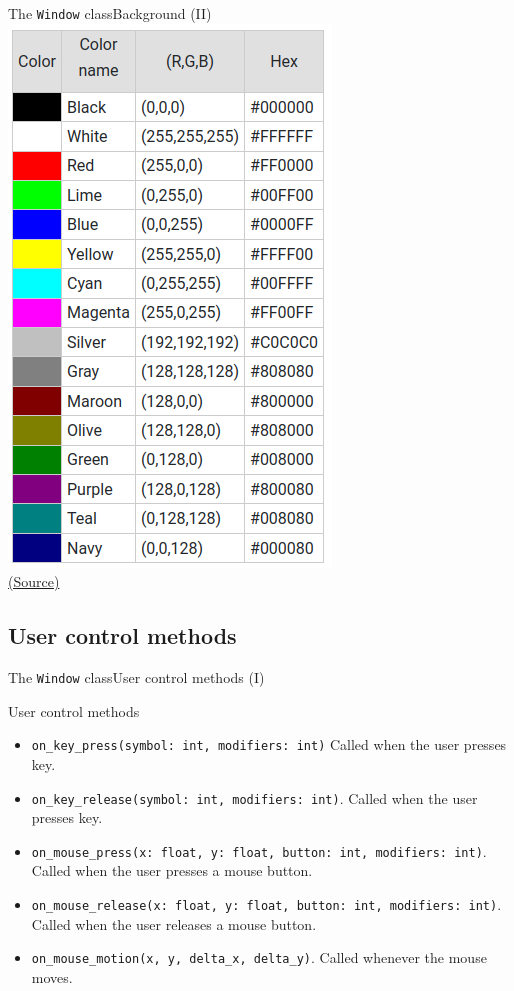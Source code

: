 \documentclass[10pt,compress]{beamer} %
\begin{document}
\begin{frame}[plain]{The \texttt{Window} class}{Background (II)}
	\centering \includegraphics[width=0.4\linewidth]{figs/colors}\\
	\tiny \href{https://www.rapidtables.com/convert/color/rgb-to-hex.html}{(Source)}
\end{frame}

\subsection{User control methods}

\begin{frame}{The \texttt{Window} class}{User control methods (I)}
	\begin{block}{User control methods}
		\begin{itemize}
		\item \footnotesize{\texttt{on\_key\_press(symbol: int, modifiers: int)}} Called when the user presses key.
		\item \footnotesize{\texttt{on\_key\_release(symbol: int, modifiers: int)}}. Called when the user presses key.
		\item \footnotesize{\texttt{on\_mouse\_press(x: float, y: float, button: int, modifiers: int)}}. Called when the user presses a mouse button.
		\item \footnotesize{\texttt{on\_mouse\_release(x: float, y: float, button: int, modifiers: int)}}.  Called when the user releases a mouse button.
		\item \footnotesize{\texttt{on\_mouse\_motion(x, y, delta\_x, delta\_y)}}. Called whenever the mouse moves.
		\end{itemize}
	\end{block}	
\end{frame}
\end{document}
